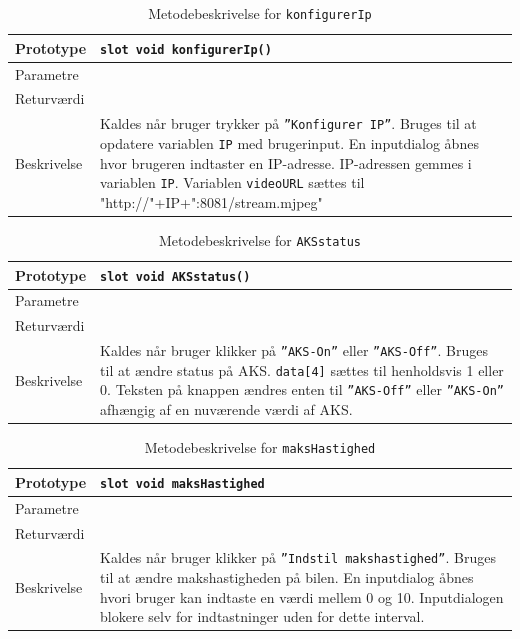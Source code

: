 \begin{table}[H]
\begin{tabularx}{\textwidth}{| l | Z |} \hline
Prototype & \texttt{slot void konfigurerIp()} \\\hline
Parametre &   \\\hline
Returværdi &  \\\hline
Beskrivelse & Kaldes når bruger trykker på \texttt{''Konfigurer IP''}. Bruges til at opdatere variablen \texttt{IP} med brugerinput. En inputdialog åbnes hvor brugeren indtaster en IP-adresse. IP-adressen gemmes i variablen \texttt{IP}. Variablen \texttt{videoURL} sættes til "http://"+IP+":8081/stream.mjpeg" \\\hline
\end{tabularx}
\caption{Metodebeskrivelse for \texttt{konfigurerIp}}
\label{table:met_konfigurerIp}
\end{table}

\begin{table}[H]
\begin{tabularx}{\textwidth}{| l | Z |} \hline
Prototype & \texttt{slot void AKSstatus()} \\\hline
Parametre &   \\\hline
Returværdi &  \\\hline
Beskrivelse & Kaldes når bruger klikker på \texttt{''AKS-On''} eller \texttt{''AKS-Off''}. Bruges til at ændre status på AKS. \texttt{data[4]} sættes til henholdsvis 1 eller 0. Teksten på knappen ændres enten til \texttt{''AKS-Off''} eller \texttt{''AKS-On''} afhængig af en nuværende værdi af AKS. \\\hline
\end{tabularx}
\caption{Metodebeskrivelse for \texttt{AKSstatus}}
\label{table:met_AKSstatus}
\end{table}

\clearpage
\begin{table}[H]
\begin{tabularx}{\textwidth}{| l | Z |} \hline
Prototype & \texttt{slot void maksHastighed} \\\hline
Parametre &   \\\hline
Returværdi &  \\\hline
Beskrivelse & Kaldes når bruger klikker på \texttt{''Indstil makshastighed''}. Bruges til at ændre makshastigheden på bilen. En inputdialog åbnes hvori bruger kan indtaste en værdi mellem 0 og 10. Inputdialogen blokere selv for indtastninger uden for dette interval.  \\\hline
\end{tabularx}
\caption{Metodebeskrivelse for \texttt{maksHastighed}}
\label{table:met_maksHastighed}
\end{table}

